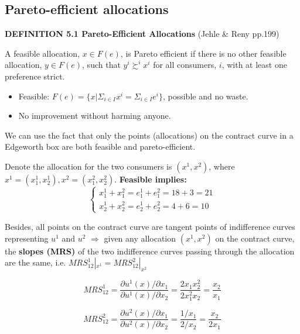 \documentclass{article}
\begin{document}
\subsection{Pareto-efficient allocations}

\begin{mdframed}[backgroundcolor=blue!20,linecolor=white]
\textbf{DEFINITION 5.1 Pareto-Efficient Allocations} (Jehle \& Reny pp.199)

A feasible allocation, $x \in F(e)$, is Pareto efficient if there is no other feasible allocation, $y \in F(e)$, such that $y^i \succsim^i x^i$ for all consumers, $i$, with at least one preference strict.

\begin{itemize}
\item Feasible: $F(e) = \{x| \Sigma_{i \in I}x^i = \Sigma_{i \in I}e^i \}$, possible and no waste.
\item No improvement without harming anyone.

\end{itemize}

\end{mdframed}

We can use the fact that only the points (allocations) on the contract curve in a 
Edgeworth box are both feasible and pareto-efficient.

Denote the allocation for the two consumers is $(x^1,x^2)$, where
$x^1 = (x^1_1,x^1_2),x^2 = (x^2_1,x^2_2)$. \textbf{Feasible implies:}
\begin{equation}
    \begin{cases}
x^1_1+x^2_1= e^1_1 +e^2_1 = 18+3 =21 \\
x^1_2+x^2_2= e^1_2 +e^2_2 = 4+6 =10
    \end{cases}
\label{eq:fe}
\end{equation}

Besides, all points on the contract curve are tangent points of 
indifference curves representing $u^1$ and $u^2$ $\Rightarrow$ given
any allocation $(x^1,x^2)$ on the contract curve, the \textbf{slopes (MRS)} of the two indifference curves passing through the allocation are the same, i.e. $MRS^1_{12} |_{x^1} = MRS^2_{12}|_{x^2}$

$$MRS^1_{12} = \frac{\partial u^1(x) / \partial x_1}{\partial u^1(x) / \partial x_2} = \frac{2x_1x_2^2}{2x_1^2x_2} = \frac{x_2}{x_1}$$

$$MRS^2_{12} = \frac{\partial u^2(x) / \partial x_1}{\partial u^2(x) / \partial x_2} = \frac{1/x_1}{2/x_2} = \frac{x_2}{2x_1}$$
\end{document}
